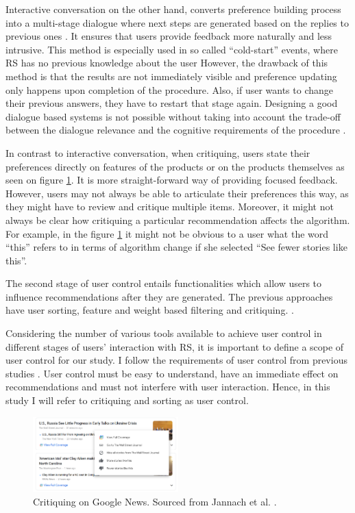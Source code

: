 \documentclass[a4paper,12pt]{article}
\newcommand{\citeyearonly}[1]{\citeyearpar{#1}}
\begin{document}
Interactive conversation on the other hand, converts preference building process into a multi-stage dialogue where next steps are generated based on the replies to previous ones \citep{he2016interactive}. It ensures that users provide feedback more naturally and less intrusive. This method is especially used in so called ``cold-start'' events, where RS has no previous knowledge about the user \citep{guAddressingColdStartProblem2019} However, the drawback of this method is that the results are not immediately visible and preference updating only happens upon completion of the procedure. Also, if user wants to change their previous answers, they have to restart that stage again. Designing a good dialogue based systems is not possible without taking into account the trade-off between the dialogue relevance and the cognitive requirements of the procedure \citep{Gao_2021}. 

In contrast to interactive conversation, when critiquing, users state their preferences directly on features of the products or on the products themselves as seen on figure \ref{fig:critiquing}. It is more straight-forward way of providing focused feedback. However, users may not always be able to articulate their preferences this way, as they might have to review and critique multiple items. Moreover, it might not always be clear how critiquing a particular recommendation affects the algorithm. For example, in the figure \ref{fig:critiquing} it might not be obvious to a user what the word ``this'' refers to in terms of algorithm change if she selected ``See fewer stories like this''.

The second stage of user control entails functionalities which allow users to influence recommendations after they are generated. The previous approaches have user sorting, feature and weight based filtering and critiquing. \citep{swearingen2001beyond, schafer2002meta, bostandjiev2012tasteweights, schaffer2015hypothetical, jannach2017user}. 

Considering the number of various tools available to achieve user control in different stages of users' interaction with RS, it is important to define a scope of user control for our study. I follow the requirements of user control from previous  studies \citep{jannach2017user}. User control must be easy to understand, have an immediate effect on recommendations and must not interfere with user interaction. Hence, in this study I will refer to critiquing and sorting as user control. 

\begin{figure}[H]
    \centering
    \includegraphics[width=0.5\textwidth]{staticFiles/critiquingRS.PNG}
    \caption[Critiquing in RS]{Critiquing on Google News. Sourced from Jannach et al. \citeyearonly{jannach2017user}.}
    \label{fig:critiquing}
\end{figure}
\end{document}
